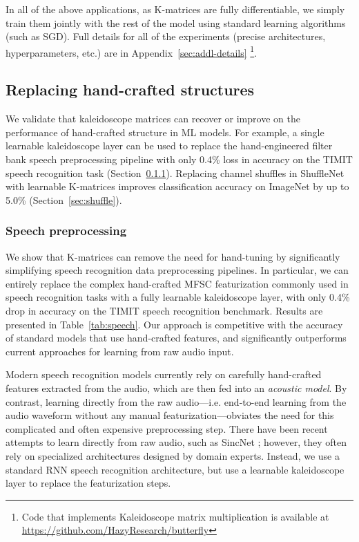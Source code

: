 In all of the above applications, as K-matrices are fully differentiable, we simply train them jointly with the rest of the model using standard learning algorithms (such as SGD). Full details for all of the experiments (precise architectures, hyperparameters, etc.) are in Appendix~\ref{sec:addl-details}
\footnote{Code that implements Kaleidoscope matrix multiplication is available at \small{\url{https://github.com/HazyResearch/butterfly}}}.

\subsection{Replacing hand-crafted structures}
\label{sec:latent-structure}

We validate that kaleidoscope matrices can recover or improve on the performance of hand-crafted structure in ML models. For example, a single learnable kaleidoscope layer can be used to replace the hand-engineered filter bank speech preprocessing pipeline with only 0.4\%
loss in accuracy on the TIMIT speech recognition task (Section~\ref{sec:speech}).
Replacing channel shuffles in ShuffleNet with learnable K-matrices improves classification accuracy on ImageNet by up to 5.0\% (Section~\ref{sec:shuffle}).

\subsubsection{Speech preprocessing}
\label{sec:speech}

We show that K-matrices can remove the need for hand-tuning by significantly simplifying speech recognition data preprocessing pipelines. In particular, we can entirely replace the complex hand-crafted MFSC featurization commonly used in speech recognition tasks with a fully learnable kaleidoscope layer, with only 0.4\% drop in accuracy on the TIMIT speech recognition benchmark. Results are presented in Table~\ref{tab:speech}. Our approach is competitive with the accuracy of standard models that use hand-crafted features, and significantly outperforms current approaches for learning from raw audio input.


Modern speech recognition models currently rely on carefully hand-crafted features extracted from the audio, which are then fed into an \textit{acoustic model}. By contrast, learning directly from the raw audio---i.e. end-to-end learning from the audio waveform without any manual featurization---obviates the need for this complicated and often expensive preprocessing step. There have been recent attempts to learn directly from raw audio, such as SincNet \citep{ravanelli2018speaker}; however, they often rely on specialized architectures designed by domain experts. Instead, we use a standard RNN speech recognition architecture, but use a learnable kaleidoscope layer to replace the featurization steps.

